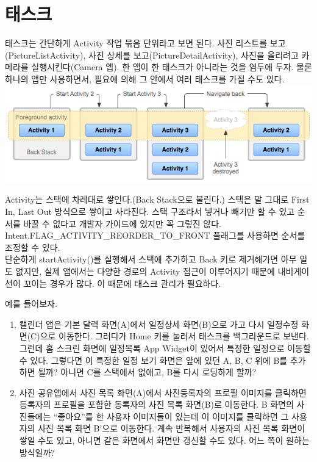 \section{태스크}
태스크는 간단하게 Activity 작업 묶음 단위라고 보면 된다. 사진 리스트를 보고(PictureListActivity), 사진 상세를 보고(PictureDetailActivity), 사진을 올리려고 카메라를 실행시킨다(Camera 앱).
한 앱이 한 태스크가 아니라는 것을 염두에 두자. 물론 하나의 앱만 사용하면서, 필요에 의해 그 안에서 여러 태스크를 가질 수도 있다.\\
\includegraphics[scale=0.6]{diagram_backstack}

Activity는 스택에 차례대로 쌓인다.(Back Stack으로 불린다.) 스택은 말 그대로 First In, Last Out 방식으로 쌓이고 사라진다. 스택 구조라서 넣거나 빼기만 할 수 있고 순서를 바꿀 수 없다고 개발자 가이드에 있지만 꼭 그렇진 않다. Intent.FLAG\_ACTIVITY\_REORDER\_TO\_FRONT 플래그를 사용하면 순서를 조정할 수 있다.\\

단순하게 startActivity()를 실행해서 스택에 추가하고 Back 키로 제거해가면 아무 일도 없지만, 실제 앱에서는 다양한 경로의 Activity 접근이 이루어지기 때문에 내비게이션이 꼬이는 경우가 많다. 이 때문에 태스크 관리가 필요하다.

예를 들어보자. 
\begin{enumerate}
\item 캘린더 앱은 기본 달력 화면(A)에서 일정상세 화면(B)으로 가고 다시 일정수정 화면(C)으로 이동한다. 그러다가 Home 키를 눌러서 태스크를 백그라운드로 보낸다. 
그런데 홈 스크린 화면에 일정목록 App Widget이 있어서 특정한 일정으로 이동할 수 있다. 그렇다면 이 특정한 일정 보기 화면은 앞에 있던 A, B, C 위에 B를 추가하면 될까? 아니면 C를 스택에서 없애고, B를 다시 로딩하게 할까?
\item 사진 공유앱에서 사진 목록 화면(A)에서 사진등록자의 프로필 이미지를 클릭하면 등록자의 프로필을 포함한 동록자의 사진 목록 화면(B)로 이동한다. B 화면의 사진들에는 ``좋아요''를 한 사용자 이미지들이 있는데 이 이미지를 클릭하면 그 사용자의 사진 목록 화면 B'으로 이동한다. 계속 반복해서 사용자의 사진 목록 화면이 쌓일 수도 있고, 아니면 같은 화면에서 화면만 갱신할 수도 있다. 어느 쪽이 원하는 방식일까?
\end{enumerate}

